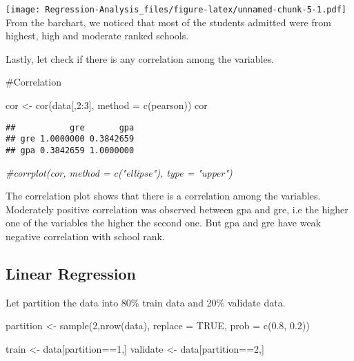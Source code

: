 \documentclass[
]{article}
\newenvironment{Shaded}{\begin{snugshade}}{\end{snugshade}}
\newcommand{\AttributeTok}[1]{\textcolor[rgb]{0.77,0.63,0.00}{#1}}
\newcommand{\CommentTok}[1]{\textcolor[rgb]{0.56,0.35,0.01}{\textit{#1}}}
\newcommand{\ConstantTok}[1]{\textcolor[rgb]{0.00,0.00,0.00}{#1}}
\newcommand{\DecValTok}[1]{\textcolor[rgb]{0.00,0.00,0.81}{#1}}
\newcommand{\FloatTok}[1]{\textcolor[rgb]{0.00,0.00,0.81}{#1}}
\newcommand{\FunctionTok}[1]{\textcolor[rgb]{0.00,0.00,0.00}{#1}}
\newcommand{\NormalTok}[1]{#1}
\newcommand{\OtherTok}[1]{\textcolor[rgb]{0.56,0.35,0.01}{#1}}
\newcommand{\SpecialCharTok}[1]{\textcolor[rgb]{0.00,0.00,0.00}{#1}}
\newcommand{\StringTok}[1]{\textcolor[rgb]{0.31,0.60,0.02}{#1}}
\begin{document}
\texttt{[image: Regression-Analysis\_files/figure-latex/unnamed-chunk-5-1.pdf]}
From the barchart, we noticed that most of the students admitted were
from highest, high and moderate ranked schools.

Lastly, let check if there is any correlation among the variables.

\#Correlation

\begin{Shaded}
\begin{Highlighting}[]
\NormalTok{cor }\OtherTok{\textless{}{-}} \FunctionTok{cor}\NormalTok{(data[,}\DecValTok{2}\SpecialCharTok{:}\DecValTok{3}\NormalTok{], }\AttributeTok{method =} \FunctionTok{c}\NormalTok{(}\StringTok{\textquotesingle{}pearson\textquotesingle{}}\NormalTok{))}
\NormalTok{cor}
\end{Highlighting}
\end{Shaded}

\begin{verbatim}
##           gre       gpa
## gre 1.0000000 0.3842659
## gpa 0.3842659 1.0000000
\end{verbatim}

\begin{Shaded}
\begin{Highlighting}[]
\CommentTok{\#corrplot(cor, method = c("ellipse"), type = "upper")}
\end{Highlighting}
\end{Shaded}

The correlation plot shows that there is a correlation among the
variables. Moderately positive correlation was observed between gpa and
gre, i.e the higher one of the variables the higher the second one. But
gpa and gre have weak negative correlation with school rank.

\hypertarget{linear-regression}{%
\subsection{Linear Regression}\label{linear-regression}}

Let partition the data into 80\% train data and 20\% validate data.

\begin{Shaded}
\begin{Highlighting}[]
\NormalTok{partition }\OtherTok{\textless{}{-}} \FunctionTok{sample}\NormalTok{(}\DecValTok{2}\NormalTok{,}\FunctionTok{nrow}\NormalTok{(data), }\AttributeTok{replace =} \ConstantTok{TRUE}\NormalTok{, }\AttributeTok{prob =} \FunctionTok{c}\NormalTok{(}\FloatTok{0.8}\NormalTok{, }\FloatTok{0.2}\NormalTok{))}

\NormalTok{train }\OtherTok{\textless{}{-}}\NormalTok{ data[partition}\SpecialCharTok{==}\DecValTok{1}\NormalTok{,]}
\NormalTok{validate }\OtherTok{\textless{}{-}}\NormalTok{ data[partition}\SpecialCharTok{==}\DecValTok{2}\NormalTok{,]}
\end{Highlighting}
\end{Shaded}
\end{document}
